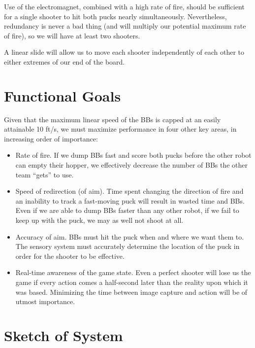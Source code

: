 \documentclass[10pt,letterpaper]{article}
\begin{document}
Use of the electromagnet, combined with a high rate of fire, should be
sufficient for a single shooter to hit both pucks nearly simultaneously.
Nevertheless, redundancy is never a bad thing (and will multiply our potential
maximum rate of fire), so we will have at least two shooters.

A linear slide will allow us to move each shooter independently of each other
to either extremes of our end of the board.


\section*{Functional Goals}

Given that the maximum linear speed of the BBs is capped at an easily
attainable 10 ft/s, we must maximize performance in four other key areas, in
increasing order of importance:

\begin{itemize}
	\item Rate of fire. If we dump BBs fast and score both pucks before the
		other robot can empty their hopper, we effectively decrease the number
		of BBs the other team ``gets'' to use.
	\item Speed of redirection (of aim). Time spent changing the direction of
		fire and an inability to track a fast-moving puck will result in wasted
		time and BBs. Even if we are able to dump BBs faster than any other
		robot, if we fail to keep up with the puck, we may as well not shoot at
		all.
	\item Accuracy of aim. BBs must hit the puck when and where we want them
		to. The sensory system must accurately determine the location of the
		puck in order for the shooter to be effective.
	\item Real-time awareness of the game state. Even a perfect shooter will
		lose us the game if every action comes a half-second later than the
		reality upon which it was based. Minimizing the time between image
		capture and action will be of utmost importance.
\end{itemize}


\newpage
\section*{Sketch of System}
\end{document}
